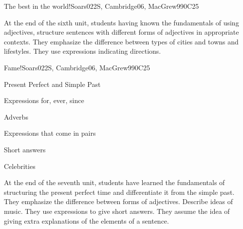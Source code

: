 \begin{syllabus}
\begin{unit}{The best in the world!}{}{Soars022S, Cambridge06, MacGrew99}{0}{C25}
   \begin{learningoutcomes}
      \item At the end of the sixth unit, students having known the fundamentals of using adjectives, structure sentences with different forms of adjectives in appropriate contexts. They emphasize the difference between types of cities and towns and lifestyles. They use expressions indicating directions.
   \end{learningoutcomes}

\end{unit}

\begin{unit}{Fame!}{}{Soars022S, Cambridge06, MacGrew99}{0}{C25}
   \begin{topics}
      \item Present Perfect and Simple Past
      \item Expressions for, ever, since
      \item Adverbs
      \item Expressions that come in pairs
      \item Short answers
      \item Celebrities
   \end{topics}

   \begin{learningoutcomes}
      \item At the end of the seventh unit, students have learned the fundamentals of structuring the present perfect time and differentiate it from the simple past. They emphasize the difference between forms of adjectives. Describe ideas of music. They use expressions to give short answers. They assume the idea of giving extra explanations of the elements of a sentence.
   \end{learningoutcomes}
\end{unit}



\begin{coursebibliography}
\end{coursebibliography}

\end{syllabus}
%
